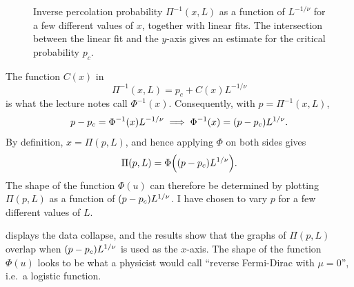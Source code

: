 \documentclass[11pt,british,a4paper]{report}
\begin{document}
\begin{figure}[H]
    \caption{Inverse percolation probability \(\Pi^{-1}(x,L)\) as a function of \(L^{-1/\nu}\) for a few different values of \(x\), together with linear fits. The intersection between the linear fit and the \(y\)-axis gives an estimate for the critical probability \(p_c\).}%
    \label{fig:n1}
\end{figure}
The function \(C(x)\) in
\begin{equation}
    \Pi^{-1}(x,L) = p_c + C(x)L^{-1/\nu}
\end{equation}
is what the lecture notes call \(\Phi^{-1}(x)\). Consequently, with \(p=\Pi^{-1}(x,L)\),
\begin{equation}
    p - p_c = \Phi^{-1}(x) L^{-1/\nu} \implies \Phi^{-1}(x) = \qty(p-p_c)L^{1/\nu}.
\end{equation}
By definition, \(x=\Pi(p,L)\), and hence applying \(\Phi\) on both sides gives
\begin{equation}
    \Pi(p,L) = \Phi\qty(\qty(p-p_c)L^{1/\nu}).
\end{equation}
The shape of the function \(\Phi(u)\) can therefore be determined by plotting \(\Pi(p,L)\) as a function of \(\qty(p-p_c)L^{1/\nu}\). I have chosen to vary \(p\) for a few different values of \(L\).

 displays the data collapse, and the results show that the graphs of \(\Pi(p,L)\) overlap when \(\qty(p-p_c)L^{1/\nu}\) is used as the \(x\)-axis. The shape of the function \(\Phi(u)\) looks to be what a physicist would call ``reverse Fermi-Dirac with \(\mu=0\)'', i.e.\ a logistic function.
\end{document}
